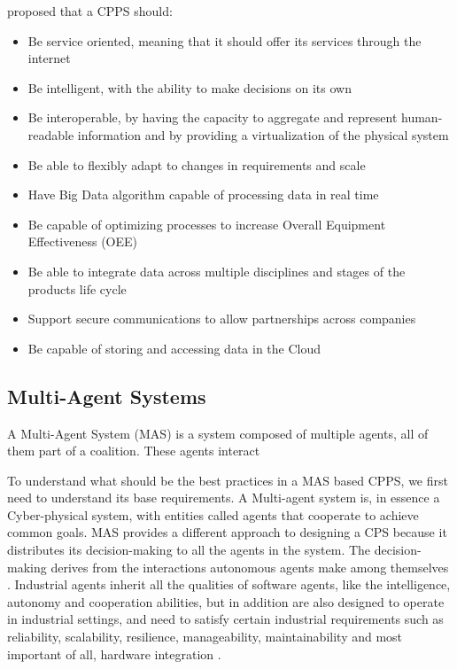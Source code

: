 \citeauthor{birgit01} \cite{birgit01} proposed that a CPPS should:
\begin{itemize}
	\item Be service oriented, meaning that it should offer its services through the internet
	\item Be intelligent, with the ability to make decisions on its own
	\item Be interoperable, by having the capacity to aggregate and represent human-readable information and by providing a virtualization of the physical system
	\item Be able to flexibly adapt to changes in requirements and scale
	\item Have Big Data algorithm capable of processing data in real time
	\item Be capable of optimizing processes to increase Overall Equipment Effectiveness (OEE)
	\item Be able to integrate data across multiple disciplines and stages of the products life cycle
	\item Support secure communications to allow partnerships across companies
	\item Be capable of storing and accessing data in the Cloud
\end{itemize}

\subsection{Multi-Agent Systems}

A Multi-Agent System (MAS) is a system composed of multiple agents, all of them part of a coalition. These agents interact

To understand what should be the best practices in a MAS based CPPS, we first need to understand its base requirements. A Multi-agent system is, in essence a Cyber-physical system, with entities called agents that cooperate to achieve common goals. MAS provides a different approach to designing a CPS because it distributes its decision-making to all the agents in the system. The decision-making derives from the interactions autonomous agents make among themselves \cite{Leitao2021}. Industrial agents inherit all the qualities of software agents, like the intelligence, autonomy and cooperation abilities, but in addition are also designed to operate in industrial settings, and need to satisfy certain industrial requirements such as reliability, scalability, resilience, manageability, maintainability and most important of all, hardware integration \cite{Leitao2021}.

